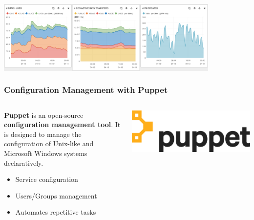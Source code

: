 \documentclass[aspectratio=169]{beamer}
\begin{document}
\begin{frame}
    \vspace{\belowdisplayskip}
    \begin{minipage}[t]{0.95\textwidth}
        \begin{center}
        \includegraphics[width=0.83\textwidth]{Eos-CreatedVm.png}
    \end{center}
    \end{minipage}
\end{frame}


\begin{frame}
    \frametitle{Configuration Management with Puppet}
    \begin{minipage}[t]{0.95\textwidth}
        \begin{columns}
            \begin{column}{0.5\textwidth}
                \textbf{Puppet} is an open-source \textbf{configuration management tool}.
                It is designed to manage the configuration of Unix-like and Microsoft Windows systems declaratively. \\
                \begin{itemize}
                    \item Service configuration
                    \item Users/Groups management
                    \item Automates repetitive tasks
                \end{itemize}
            \end{column}
            \begin{column}{0.5\textwidth}
                \vspace{-10px}
                \includegraphics[width=1.1\textwidth]{puppet-labs-logo.png}
            \end{column}
        \end{columns}
    \end{minipage}
\end{frame}
\end{document}
